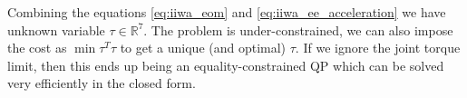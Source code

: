 \documentclass{article}
\begin{document}
Combining the equations \eqref{eq:iiwa_eom} and \eqref{eq:iiwa_ee_acceleration} we have unknown variable $\tau\in\mathbb{R}^7$. The problem is under-constrained, we can also impose the cost as $\min \tau^T\tau$ to get a unique (and optimal) $\tau$. If we ignore the joint torque limit, then this ends up being an equality-constrained QP which can be solved very efficiently in the closed form.
\end{document}

